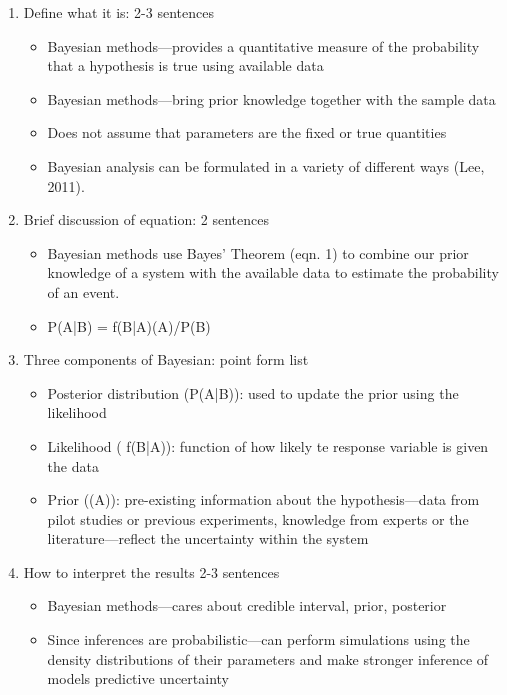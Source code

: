 \documentclass{article}
\begin{document}
\begin{enumerate}
\item Define what it is: 2-3 sentences
\begin{itemize}
\item Bayesian methods—provides a quantitative measure of the probability that a hypothesis is true using available data
\item Bayesian methods—bring prior knowledge together with the sample data
\item Does not assume that parameters are the fixed or true quantities
\item Bayesian analysis can be formulated in a variety of different ways (Lee, 2011).
\end{itemize}
\item Brief discussion of equation: 2 sentences
\begin{itemize}
\item Bayesian methods use Bayes' Theorem (eqn. 1) to combine our prior knowledge of a system with the available data to estimate the probability of an event. 
\item P(A|B) = f(B|A)(A)/P(B)
\end{itemize}
\item Three components of Bayesian: point form list
\begin{itemize}
\item Posterior distribution (P(A|B)): used to update the prior using the likelihood
\item Likelihood ( f(B|A)): function of how likely te response variable is given the data
\item Prior ((A)): pre-existing information about the hypothesis—data from pilot studies or previous experiments, knowledge from experts or the literature—reflect the uncertainty within the system
\end{itemize}
\item How to interpret the results 2-3 sentences
\begin{itemize}
\item Bayesian methods—cares about credible interval, prior, posterior
\item Since inferences are probabilistic—can perform simulations using the density distributions of their parameters and make stronger inference of models predictive uncertainty
\end{itemize}
\end{enumerate}
\end{document}
